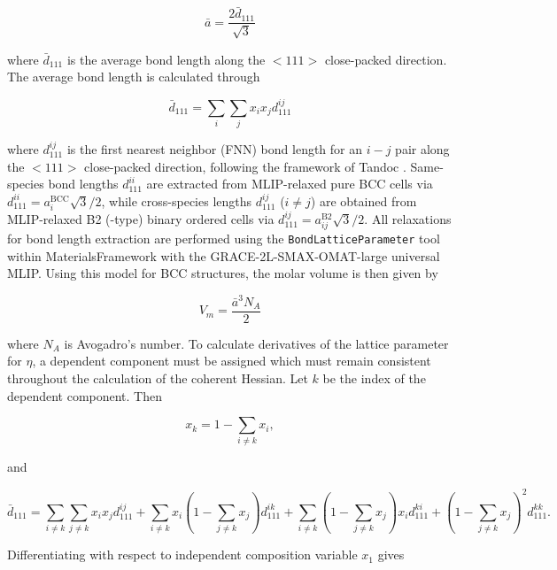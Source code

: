 \begin{equation}\label{lattice_param}
    \bar{a}=\frac{2\bar{d}_{111}}{\sqrt{3}}
\end{equation}

\noindent where $\bar{d}_{111}$ is the average bond length along the $<111>$ close-packed direction. The average bond length is calculated through

\begin{equation}
    \bar{d}_{111}=\sum_i\sum_jx_ix_jd^{ij}_{111}
\end{equation}

\noindent where $d^{ij}_{111}$ is the first nearest neighbor (FNN) bond length for an $i-j$ pair along the $<111>$ close-packed direction, following the framework of Tandoc \etal \cite{tandoc2025bond}. Same-species bond lengths $d^{ii}_{111}$ are extracted from MLIP-relaxed pure BCC cells via $d^{ii}_{111} = a_i^{\text{BCC}}\sqrt{3}/2$, while cross-species lengths $d^{ij}_{111}$ ($i \neq j$) are obtained from MLIP-relaxed B2 (-type) binary ordered cells via $d^{ij}_{111} = a_{ij}^{\text{B2}}\sqrt{3}/2$. All relaxations for bond length extraction are performed using the \texttt{BondLatticeParameter} tool within MaterialsFramework \cite{sariturk_2025_15731044} with the GRACE-2L-SMAX-OMAT-large universal MLIP. Using this model for BCC structures, the molar volume is then given by

\begin{equation}
V_m=\frac{\bar{a}^3N_A}{2}
\end{equation}

\noindent where $N_A$ is Avogadro's number. To calculate derivatives of the lattice parameter for $\eta$, a dependent component must be assigned which must remain consistent throughout the calculation of the coherent Hessian. Let $k$ be the index of the dependent component. Then

\begin{equation}
    x_k=1-\sum_{i\neq k}x_i,
\end{equation}

\noindent and

\begin{equation}\label{bond_length_dep}
\bar{d}_{111}= \sum_{i\neq k}\sum_{j\neq k}x_ix_jd^{ij}_{111} + \sum_{i\neq k} x_i(1-\sum_{j\neq k}x_j)d^{ik}_{111} + \sum_{i\neq k}(1-\sum_{j\neq k}x_j)x_id^{ki}_{111} + (1-\sum_{j\neq k}x_j)^2d^{kk}_{111}.
\end{equation}

\noindent Differentiating  with respect to independent composition variable $x_1$ gives

